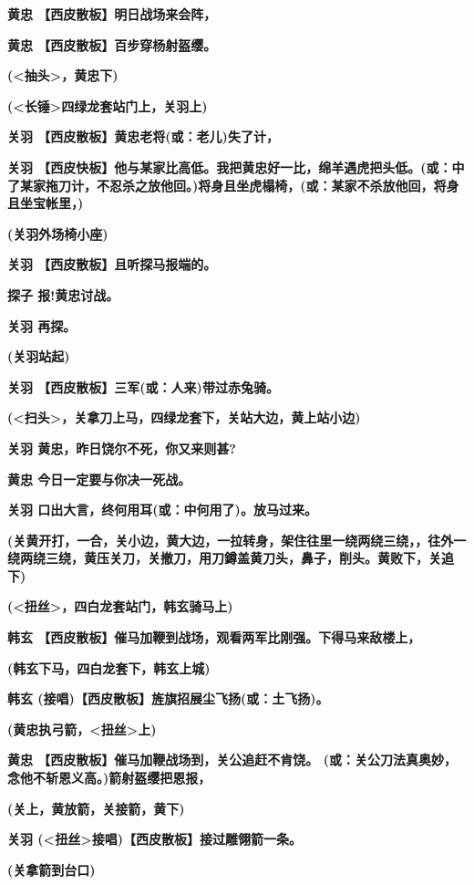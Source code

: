 \textbf{黄忠 【西皮散板】明日战场来会阵，}

\textbf{黄忠 【西皮散板】百步穿杨射盔缨。}

\textbf{(\textless{}抽头\textgreater{}，黄忠下)}

\textbf{(\textless{}长锤\textgreater{}四绿龙套站门上，关羽上)}

\textbf{关羽 【西皮散板】黄忠老将(或：老儿)失了计，}

\textbf{关羽
【西皮快板】他与某家比高低。我把黄忠好一比，绵羊遇虎把头低。(或：中了某家拖刀计，不忍杀之放他回。)将身且坐虎榻椅，(或：某家不杀放他回，将身且坐宝帐里，)}

\textbf{(关羽外场椅小座)}

\textbf{关羽 【西皮散板】且听探马报端的。}

\textbf{探子 报!黄忠讨战。}

\textbf{关羽 再探。}

\textbf{(关羽站起)}

\textbf{关羽 【西皮散板】三军(或：人来)带过赤兔骑。}

\textbf{(\textless{}扫头\textgreater{}，关拿刀上马，四绿龙套下，关站大边，黄上站小边)}

\textbf{关羽 黄忠，昨日饶尔不死，你又来则甚?}

\textbf{黄忠 今日一定要与你决一死战。}

\textbf{关羽 口出大言，终何用耳(或：中何用了)。放马过来。}

\textbf{(关黄开打，一合，关小边，黄大边，一拉转身，架住往里一绕两绕三绕，，往外一绕两绕三绕，黄压关刀，关撤刀，用刀鐏盖黄刀头，鼻子，削头。黄败下，关追下)}

\textbf{(\textless{}扭丝\textgreater{}，四白龙套站门，韩玄骑马上)}

\textbf{韩玄
【西皮散板】催马加鞭到战场，观看两军比刚强。下得马来敌楼上，}

\textbf{(韩玄下马，四白龙套下，韩玄上城)}

\textbf{韩玄 (接唱)【西皮散板】旌旗招展尘飞扬(或：土飞扬)。}

\textbf{(黄忠执弓箭，\textless{}扭丝\textgreater{}上)}

\textbf{黄忠 【西皮散板】催马加鞭战场到，关公追赶不肯饶。
(或：关公刀法真奥妙，念他不斩恩义高。)箭射盔缨把恩报，}

\textbf{(关上，黄放箭，关接箭，黄下)}

\textbf{关羽
(\textless{}扭丝\textgreater{}接唱)【西皮散板】接过雕翎箭一条。}

\textbf{(关拿箭到台口)}

